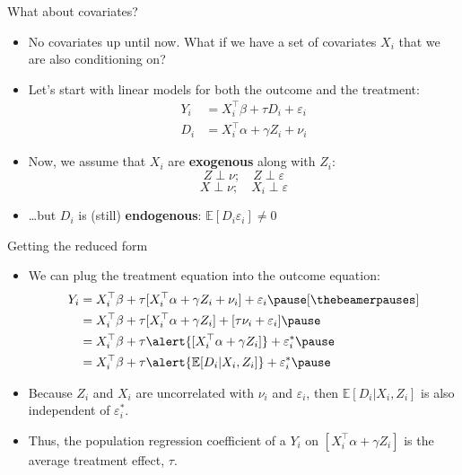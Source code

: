 \documentclass[xcolor=dvipsnames]{beamer}
\newcommand{\E}{\mathbb{E}}
\begin{document}
\begin{frame}{What about covariates?}

\begin{itemize}[<+->]
\item
  No covariates up until now. What if we have a set of covariates
  \(X_i\) that we are also conditioning on?
\item
  Let's start with linear models for both the outcome and the treatment:
  \[\begin{aligned}
  Y_i &= X_i^{\top}\beta + \tau D_i + \varepsilon_i \\
  D_i &= X_i^{\top}\alpha + \gamma Z_i + \nu_i
  \end{aligned}\]
\item
  Now, we assume that \(X_i\) are \textbf{exogenous} along with \(Z_i\):
  \[Z \perp \nu; \quad Z\perp \varepsilon \]
  \[X \perp \nu; \quad X_i \perp \varepsilon\]
\item
  \ldots{}but \(D_i\) is (still) \textbf{endogenous}:
  \(\E[D_i\varepsilon_i] \neq 0\)
\end{itemize}

\end{frame}

\begin{frame}{Getting the reduced form}

\begin{itemize}[<+->]
\item
  We can plug the treatment equation into the outcome equation:
  \[\begin{aligned}
  Y_i &= X_i^{\top}\beta + \tau[X_i^{\top}\alpha + \gamma Z_i + \nu_i] + \varepsilon_i \pause[\thebeamerpauses]\\
  &= X_i^{\top}\beta + \tau[X_i^{\top}\alpha + \gamma Z_i] + [\tau \nu_i + \varepsilon_i]\pause \\
  &= X_i^{\top}\beta + \tau\alert{[X_i^{\top}\alpha + \gamma Z_i]} + \varepsilon^*_i \pause \\
  &= X_i^{\top}\beta + \tau\alert{\E[D_i|X_i,Z_i]} + \varepsilon^*_i \pause \\
  \end{aligned}\]
\item
  Because \(Z_i\) and \(X_i\) are uncorrelated with \(\nu_i\) and
  \(\varepsilon_i\), then \(\E[D_i|X_i,Z_i]\) is also independent of
  \(\varepsilon^*_i\).
\item
  Thus, the population regression coefficient of a \(Y_i\) on
  \([X^{\top}_i\alpha + \gamma Z_i]\) is the average treatment effect,
  \(\tau\).
\end{itemize}
\end{frame}
\end{document}
